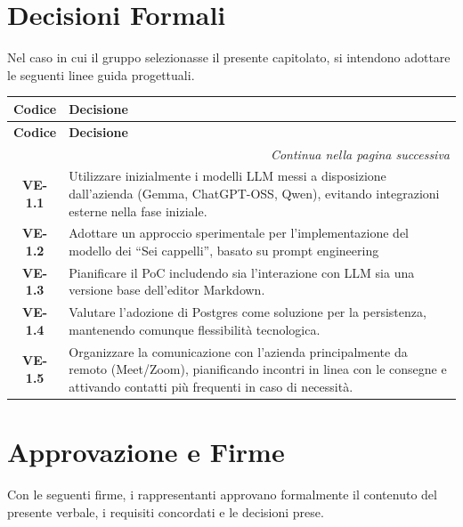 \section{Decisioni Formali}
Nel caso in cui il gruppo selezionasse il presente capitolato, si intendono adottare le seguenti linee guida progettuali.

\renewcommand{\arraystretch}{1.3}
\vspace{-0.3cm}
\noindent
\begin{longtable}{c p{12cm}}
    \toprule
    \textbf{Codice} & \textbf{Decisione} \\
    \midrule
    \endfirsthead

    \toprule
    \textbf{Codice} & \textbf{Decisione} \\
    \midrule
    \endhead

    \midrule
    \multicolumn{2}{r}{\textit{Continua nella pagina successiva}} \\
    \midrule
    \endfoot

    \bottomrule
    \endlastfoot

    \textbf{VE-1.1} & Utilizzare inizialmente i modelli LLM messi a disposizione dall’azienda (Gemma, ChatGPT-OSS, Qwen), evitando integrazioni esterne nella fase iniziale. \\
    \textbf{VE-1.2} & Adottare un approccio sperimentale per l’implementazione del modello dei “Sei cappelli”, basato su prompt engineering \\
    \textbf{VE-1.3} & Pianificare il PoC includendo sia l’interazione con LLM sia una versione base dell’editor Markdown. \\
    \textbf{VE-1.4} & Valutare l’adozione di Postgres come soluzione per la persistenza, mantenendo comunque flessibilità tecnologica. \\
    \textbf{VE-1.5} & Organizzare la comunicazione con l’azienda principalmente da remoto (Meet/Zoom), pianificando incontri in linea con le consegne e attivando contatti più frequenti in caso di necessità. \\
\end{longtable}

\newpage
\section*{Approvazione e Firme}
Con le seguenti firme, i rappresentanti approvano formalmente il contenuto del presente verbale, i requisiti concordati e le decisioni prese.

